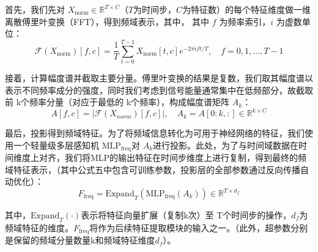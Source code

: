 \documentclass{setp-new}
\begin{document}
首先，我们先对 $X_{\text{norm}} \in \mathbb{R}^{T \times C}$（$T$为时间步，$C$为特征数）的每个特征维度做一维离散傅里叶变换（FFT），得到频域表示，其中，    其中 $f$ 为频率索引，$i$ 为虚数单位：
    \begin{equation}
    \mathcal{F}(X_{\text{norm}})[f, c] = \frac{1}{T} \sum_{t=0}^{T-1} X_{\text{norm}}[t,c] e^{-2\pi i f t / T}, \quad f=0,1,\dots,T-1
    \end{equation}

   接着，计算幅度谱并截取主要分量。傅里叶变换的结果是复数，我们取其幅度谱以表示不同频率成分的强度，同时我们考虑到信号能量通常集中在低频部分，故截取前 k个频率分量（对应于最低的 k个频率），构成幅度谱矩阵 $A_k$：
    \begin{equation}
    A[f,c] = \left| \mathcal{F}(X_{norm})[f,c] \right|, \quad A_k = A[0:k, :] \in \mathbb{R}^{k \times C}
    \end{equation}

   最后，投影得到频域特征。为了将频域信息转化为可用于神经网络的特征，我们使用一个轻量级多层感知机 $\text{MLP}_{\text{freq}}$对 $A_k$进行投影。此处，为了与时间域数据在时间维度上对齐，我们将MLP的输出特征在时间步维度上进行复制，得到最终的频域特征表示，（其中公式五中包含可训练参数，投影层的全部参数通过反向传播自动优化）：
    \begin{equation}
   F_{\text{freq}} = \text{Expand}_T (\text{MLP}_{\text{freq}}(A_k)) \in \mathbb{R}^{T \times d_f}
    \end{equation}

其中，$\text{Expand}_{T}(\cdot)$表示将特征向量扩展（复制k次）至 T个时间步的操作，$d_f$为频域特征的维度。$F_{\text{freq}}$将作为后续特征提取模块的输入之一。（此外，超参数分别是保留的频域分量数量k和频域特征维度\(d_f\)）。
\end{document}
